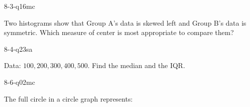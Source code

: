 \begin{practiceQuestion}{8-3-q16}{mc}
\begin{questionText}
Two histograms show that Group A's data is skewed left and Group B's data is symmetric. Which measure of center is most appropriate to compare them?
\end{questionText}
\end{practiceQuestion}

\begin{practiceQuestion}{8-4-q23}{sa}
\begin{questionText}
Data: $100, 200, 300, 400, 500$. Find the median and the IQR.
\end{questionText}
\end{practiceQuestion}

\begin{practiceQuestion}{8-6-q02}{mc}
\begin{questionText}
The full circle in a circle graph represents:
\end{questionText}
\end{practiceQuestion}

